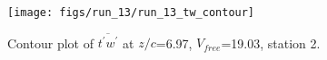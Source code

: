 \begin{figure}[H]
\centering
\texttt{[image: figs/run\_13/run\_13\_tw\_contour]}
\caption{Contour plot of $\overline{t^\prime w^\prime}$ at $z/c$=6.97, $V_{free}$=19.03, station 2.}
\label{fig:run_13_tw_contour}
\end{figure}


